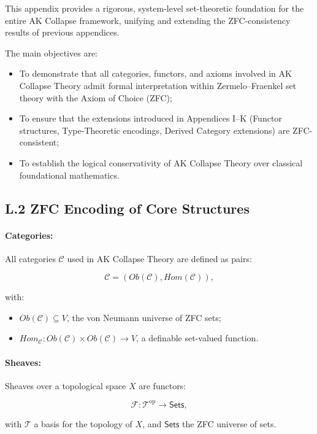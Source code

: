 \documentclass[11pt]{article}
\begin{document}
This appendix provides a rigorous, system-level set-theoretic foundation for the entire AK Collapse framework, unifying and extending the ZFC-consistency results of previous appendices.

The main objectives are:

\begin{itemize}
    \item To demonstrate that all categories, functors, and axioms involved in AK Collapse Theory admit formal interpretation within Zermelo–Fraenkel set theory with the Axiom of Choice (ZFC);
    \item To ensure that the extensions introduced in Appendices I–K (Functor structures, Type-Theoretic encodings, Derived Category extensions) are ZFC-consistent;
    \item To establish the logical conservativity of AK Collapse Theory over classical foundational mathematics.
\end{itemize}

\subsection*{L.2 ZFC Encoding of Core Structures}

\paragraph{Categories:}  
All categories \( \mathcal{C} \) used in AK Collapse Theory are defined as pairs:

\[
\mathcal{C} = (Ob(\mathcal{C}), Hom(\mathcal{C})),
\]

with:

\begin{itemize}
    \item \( Ob(\mathcal{C}) \subseteq V \), the von Neumann universe of ZFC sets;
    \item \( Hom_{\mathcal{C}} : Ob(\mathcal{C}) \times Ob(\mathcal{C}) \to V \), a definable set-valued function.
\end{itemize}

\paragraph{Sheaves:}  
Sheaves over a topological space \( X \) are functors:

\[
\mathcal{F} : \mathcal{T}^{\mathrm{op}} \to \mathsf{Sets},
\]

with \( \mathcal{T} \) a basis for the topology of \( X \), and \( \mathsf{Sets} \) the ZFC universe of sets.
\end{document}
